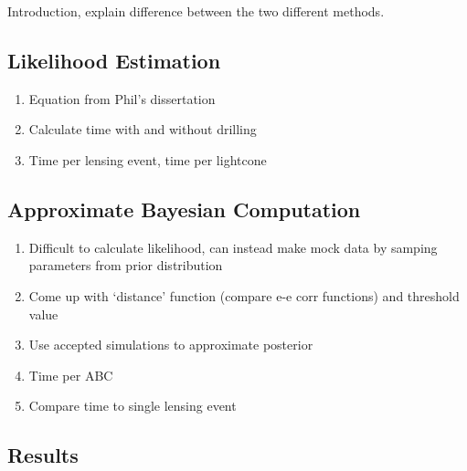 \documentclass[%
 reprint,
 amsmath,amssymb,
 aps,nofootinbib
]{revtex4-1}
\begin{document}
Introduction, explain difference between the two different methods.


\subsection{Likelihood Estimation}

\begin{enumerate}
\item Equation from Phil's dissertation
\item Calculate time with and without drilling
\item Time per lensing event, time per lightcone
\end{enumerate}


\subsection{Approximate Bayesian Computation}

\begin{enumerate}
\item Difficult to calculate likelihood, can instead make mock data by samping parameters from prior distribution
\item Come up with `distance' function (compare e-e corr functions) and threshold value
\item Use accepted simulations to approximate posterior
\item Time per ABC
\item Compare time to single lensing event
\end{enumerate}


\subsection{Results}


\end{document}
